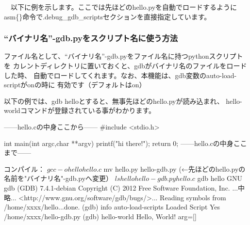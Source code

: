 \documentclass[mingoth,a4paper]{jsarticle}
\begin{document}
　以下に例を示します。ここでは先ほどのhello.pyを自動でロードするように
asm\{\}命令で.debug\_gdb\_scriptsセクションを直接指定しています。


\subsubsection{``バイナリ名''-gdb.pyをスクリプト名に使う方法}

 ファイル名として、``バイナリ名''-gdb.pyをファイル名に持つpythonスクリプトを
カレントディレクトリに置いておくと、gdbがバイナリ名のファイルをロードした時、
自動でロードしてくれます。なお、本機能は、gdb変数のauto-load-scriptがonの時に
有効です（デフォルトはon）

 以下の例では、gdb helloとすると、無事先ほどのhello.pyが読み込まれ、
hello-worldコマンドが登録されている事がわかります。

\begin{commandline}
------hello.cの中身ここから------
#include <stdio.h>

int main(int argc,char **argv)
{
        printf("hi there!");
        return 0;
}
------hello.cの中身ここまで------

コンパイル：
$ gcc -o hello hello.c
$ mv hello.py hello-gdb.py (←先ほどのhello.pyの名前を"バイナリ名"-gdb.pyへ変更）
$ ls 
hello hello-gdb.py hello.c
$ gdb hello
GNU gdb (GDB) 7.4.1-debian
Copyright (C) 2012 Free Software Foundation, Inc.
...中略...
<http://www.gnu.org/software/gdb/bugs/>...
Reading symbols from /home/xxxx/hello...done.
(gdb) info auto-load-scripts
Loaded  Script                                                                 
Yes     /home/xxxx/hello-gdb.py
(gdb) hello-world 
Hello, World! arg=[]
\end{commandline}
\end{document}
